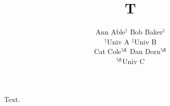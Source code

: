 \documentclass{article}
\title{T}
\author{Ann Able$^{\dagger}$ \quad Bob Baker$^{\ddagger}$ \\ $^\dagger$Univ A \quad $^\ddagger$Univ B \\[1em] Cat Cole$^{\S}$ \quad Dan Dorn$^{\S}$ \\ $^{\S}$Univ C}
\begin{document}
\maketitle
Text.
\end{document}
